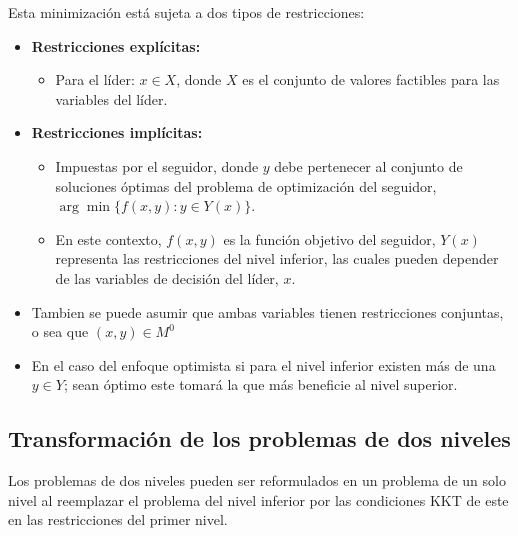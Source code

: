 Esta minimización está sujeta a dos tipos de restricciones: 
\begin{itemize}
    \item \textbf{Restricciones explícitas:}
    \begin{itemize}
        \item Para el líder: $x \in X$, donde $X$ es el conjunto de valores factibles para las variables del líder.
    \end{itemize}
    
    \item \textbf{Restricciones implícitas:}
    \begin{itemize}
        \item Impuestas por el seguidor, donde $y$ debe pertenecer al conjunto de soluciones óptimas del problema de optimización del seguidor, $\arg\min\{f(x, y) : y \in Y(x)\}$.
        \item En este contexto, $f(x, y)$ es la función objetivo del seguidor, $Y(x)$ representa las restricciones del nivel inferior, las cuales pueden depender de las variables de decisión del líder, $x$.
    \end{itemize}
	\item Tambien se puede asumir que ambas variables tienen restricciones conjuntas, o sea que $(x,y) \in M^0$
    \item En el caso del enfoque optimista si para el nivel inferior existen más de una $y \in Y$; sean óptimo este tomará la que más beneficie al nivel superior. 
\end{itemize}


\subsection{Transformación de los problemas de dos niveles}
		
		Los problemas de dos niveles pueden ser reformulados en un problema de un solo nivel al reemplazar el problema del nivel inferior por las condiciones KKT de este en las restricciones del primer nivel. 
		
